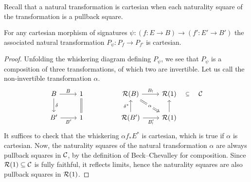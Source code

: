 Recall that a natural transformation is cartesian
when each naturality square of the transformation is
a pullback square.
\begin{proposition}
  For any cartesian morphism of signatures
  $\psi : (f : E \to B) \to (f' : E' \to B')$
  the associated natural transformation $P_\psi : P_f \to P_{f'}$
  is cartesian.
\end{proposition}
\begin{proof}
  Unfolding the whiskering diagram defining $P_\psi$,
  we see that $P_\psi$ is a composition of three transformations,
  of which two are invertible.
  Let us call the non-invertible transformation $\alpha$.
  \[ \begin{tikzcd}
    B & 1 && {\RR(B)} & {\RR(1)} & \CC \\
    {B'} & 1 && {\RR(B')} & {\RR(1)}
    \arrow["{{{{B}}}}", from=1-1, to=1-2]
    \arrow["{{{{\delta}}}}", from=1-1, to=2-1]
    \arrow["{B_!}", from=1-4, to=1-5]
    \arrow["\alpha"{description}, Rightarrow, from=1-4, to=2-5]
    \arrow["\subseteq"{description}, draw=none, from=1-5, to=1-6]
    \arrow["{{{{B'}}}}"', from=2-1, to=2-2]
    \arrow[equals, from=2-2, to=1-2]
    \arrow["{\delta^*}", from=2-4, to=1-4]
    \arrow["{B'_!}"', from=2-4, to=2-5]
    \arrow[from=2-5, to=1-5]
  \end{tikzcd}\]
  It suffices to check that the whiskering $\alpha f_* E^*$ is cartesian,
  which is true if $\alpha$ is cartesian.
  Now, the naturality squares of the natural transformation
  $\alpha$ are always pullback squares in $\mathcal{C}$,
  by the definition of Beck--Chevalley for composition.
  Since $\mathcal{R}(1) \subseteq \mathcal{C}$ is fully faithful,
  it reflects limits,
  hence the naturality squares are also pullback squares in $\mathcal{R}(1)$.
\end{proof}

